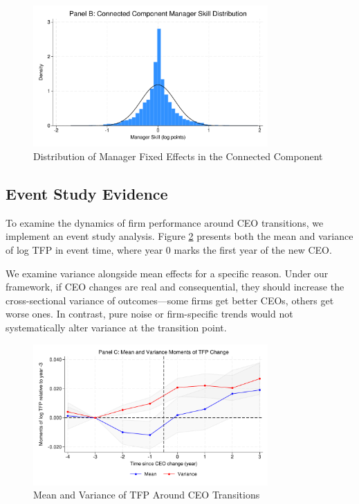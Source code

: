 \documentclass[11pt,a4paper]{article}
\begin{document}
\begin{figure}[htbp]
\centering
\includegraphics[width=0.8\textwidth]{figure/manager_skill_connected.pdf}
\caption{Distribution of Manager Fixed Effects in the Connected Component}
\label{fig:manager_distribution}
\end{figure}

\subsection{Event Study Evidence}

To examine the dynamics of firm performance around CEO transitions, we implement an event study analysis. Figure \ref{fig:event_study_combined} presents both the mean and variance of log TFP in event time, where year 0 marks the first year of the new CEO.

We examine variance alongside mean effects for a specific reason. Under our framework, if CEO changes are real and consequential, they should increase the cross-sectional variance of outcomes—some firms get better CEOs, others get worse ones. In contrast, pure noise or firm-specific trends would not systematically alter variance at the transition point.

\begin{figure}[htbp]
\centering
\includegraphics[width=0.8\textwidth]{figure/event_study_panel_c.pdf}
\caption{Mean and Variance of TFP Around CEO Transitions}
\label{fig:event_study_combined}
\end{figure}
\end{document}
